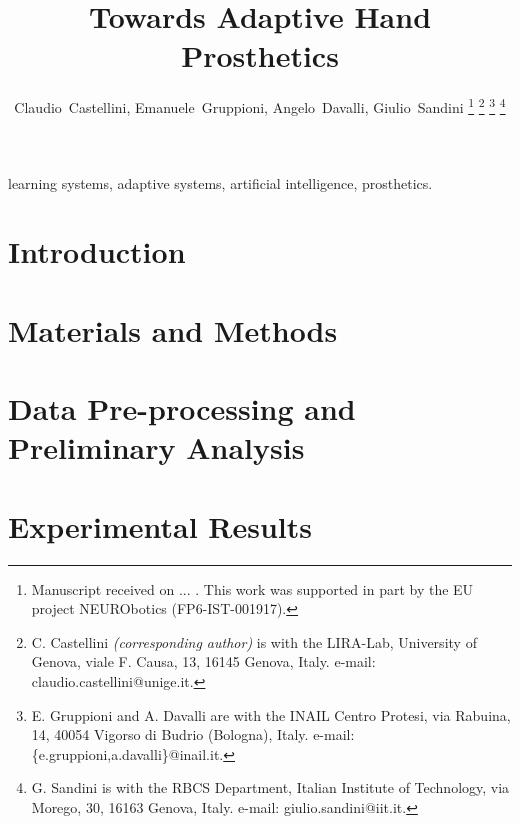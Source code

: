 \documentclass[journal]{IEEEtran}
\begin{document}
\title{Towards Adaptive Hand Prosthetics}

\author{Claudio~Castellini, Emanuele~Gruppioni, Angelo~Davalli, Giulio~Sandini%
\thanks{Manuscript received on ... . This work was supported in part
  by the EU project NEURObotics (FP6-IST-001917).}%
\thanks{C. Castellini \emph{(corresponding author)}
  is with the LIRA-Lab, University of Genova,
  viale F. Causa, 13, 16145 Genova, Italy.
  e-mail: claudio.castellini@unige.it.}%
\thanks{E. Gruppioni and A. Davalli
  are with the INAIL Centro Protesi,
  via Rabuina, 14, 40054 Vigorso di Budrio (Bologna), Italy.
  e-mail: \{e.gruppioni,a.davalli\}@inail.it.}%
\thanks{G. Sandini
  is with the RBCS Department, Italian Institute of Technology,
  via Morego, 30, 16163 Genova, Italy.
  e-mail: giulio.sandini@iit.it.}%
}

\maketitle

\begin{abstract}
  
\end{abstract}

\begin{IEEEkeywords}
  learning systems, adaptive systems, artificial intelligence, prosthetics.
\end{IEEEkeywords}

\IEEEpeerreviewmaketitle

\section{Introduction}
\label{sec:introduction}


\section{Materials and Methods}
\label{sec:m&ms}


\section{Data Pre-processing and Preliminary Analysis}
\label{sec:pre}


\section{Experimental Results}
\label{sec:exp}

\end{document}
